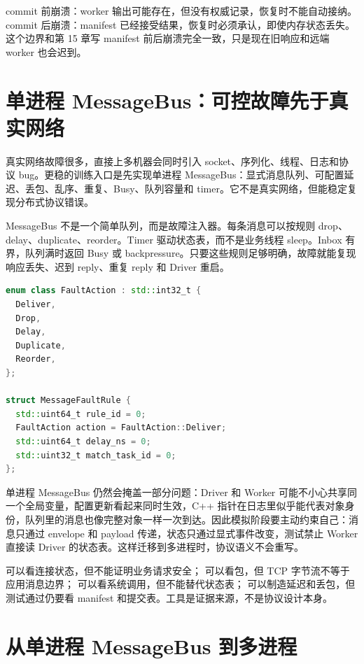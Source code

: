 commit 前崩溃：worker 输出可能存在，但没有权威记录，恢复时不能自动接纳。commit 后崩溃：manifest 已经接受结果，恢复时必须承认，即使内存状态丢失。这个边界和第 15 章写 manifest 前后崩溃完全一致，只是现在旧响应和远端 worker 也会迟到。

\section{单进程 MessageBus：可控故障先于真实网络}

真实网络故障很多，直接上多机器会同时引入 socket、序列化、线程、日志和协议 bug。更稳的训练入口是先实现单进程 MessageBus：显式消息队列、可配置延迟、丢包、乱序、重复、Busy、队列容量和 timer。它不是真实网络，但能稳定复现分布式协议错误。

MessageBus 不是一个简单队列，而是故障注入器。每条消息可以按规则 drop、delay、duplicate、reorder。Timer 驱动状态表，而不是业务线程 sleep。Inbox 有界，队列满时返回 Busy 或 backpressure。只要这些规则足够明确，故障就能复现响应丢失、迟到 reply、重复 reply 和 Driver 重启。

\begin{lstlisting}[language=C++,caption={MessageBus 故障规则的示例形态}]
enum class FaultAction : std::int32_t {
  Deliver,
  Drop,
  Delay,
  Duplicate,
  Reorder,
};

struct MessageFaultRule {
  std::uint64_t rule_id = 0;
  FaultAction action = FaultAction::Deliver;
  std::uint64_t delay_ns = 0;
  std::uint32_t match_task_id = 0;
};
\end{lstlisting}

单进程 MessageBus 仍然会掩盖一部分问题：Driver 和 Worker 可能不小心共享同一个全局变量，配置更新看起来同时生效，C++ 指针在日志里似乎能代表对象身份，队列里的消息也像完整对象一样一次到达。因此模拟阶段要主动约束自己：消息只通过 envelope 和 payload 传递，状态只通过显式事件改变，测试禁止 Worker 直接读 Driver 的状态表。这样迁移到多进程时，协议语义不会重写。

 可以看连接状态，但不能证明业务请求安全； 可以看包，但 TCP 字节流不等于应用消息边界； 可以看系统调用，但不能替代状态表； 可以制造延迟和丢包，但测试通过仍要看 manifest 和提交表。工具是证据来源，不是协议设计本身。

\section{从单进程 MessageBus 到多进程}

